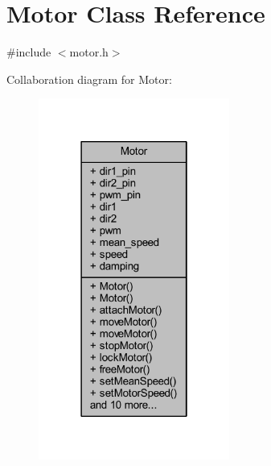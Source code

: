 \hypertarget{class_motor}{}\section{Motor Class Reference}
\label{class_motor}


{\ttfamily \#include $<$motor.\+h$>$}



Collaboration diagram for Motor\+:
\nopagebreak
\begin{figure}[H]
\begin{center}
\leavevmode
\includegraphics[width=178pt]{d7/d46/class_motor__coll__graph}
\end{center}
\end{figure}
